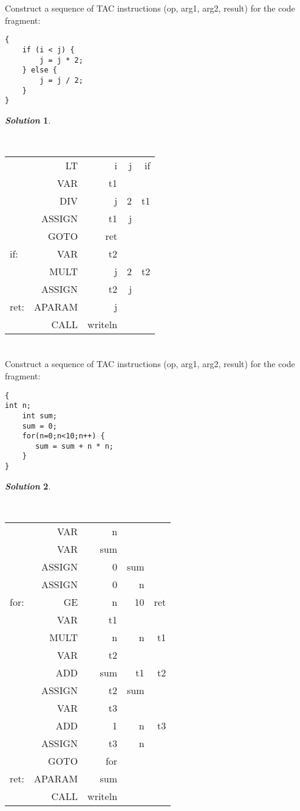 \documentclass[11pt, a4paper]{article}
\newtheorem*{solution}{\emph{Solution}}
\begin{document}
\section{}
	Construct a sequence of TAC instructions (op, arg1, arg2, result) for the code fragment:\\
\begin{lstlisting}
{
	if (i < j) {
		j = j * 2;
	} else {
		j = j / 2;
	} 
}
\end{lstlisting}
\begin{solution}\end{solution}~\\
\begin{tabular}{lrrrr}
&LT&i&j&if\\
&VAR&t1&&\\
&DIV&j&2&t1\\
&ASSIGN&t1&j&\\
&GOTO&ret&&\\
if:&VAR&t2&&\\
&MULT&j&2&t2\\
&ASSIGN&t2&j&\\
ret:&APARAM&j&&\\
&CALL&writeln&&\\
\end{tabular}

\section{}
	Construct a sequence of TAC instructions (op, arg1, arg2, result) for the code fragment:
\begin{lstlisting}
{
int n;
    int sum;
    sum = 0;
    for(n=0;n<10;n++) {
       sum = sum + n * n;
    }
}
\end{lstlisting}

\begin{solution}\end{solution}~\\

\begin{tabular}{lrrrr}
	  &      VAR &    n&&\\
      &  VAR   &  sum&&\\
      &  ASSIGN&  0   &    sum&\\
     &   ASSIGN  &0    &   n&\\
for:   & GE    &  n   &    10   &   ret\\
      &  VAR &    t1&&\\
    &    MULT  &   n  &     n    &   t1\\
      &  VAR    & t2&&\\
    &    ADD  &   sum    & t1   &   t2\\
     &   ASSIGN&  t2    &  sum&\\
     &   VAR &    t3&&\\
    &    ADD  &   1   &    n     &  t3\\
   &     ASSIGN&  t3   &   n&\\
   &     GOTO &   for&&\\
ret: &   APARAM& sum&&\\
   &     CALL& writeln&&\\
        \end{tabular}
        
\end{document}

